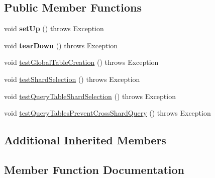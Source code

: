 \subsection*{Public Member Functions}
\begin{DoxyCompactItemize}
\item 
\mbox{\label{classtestsuite_1_1fabric_1_1jdbc_1_1_test_fabric_my_s_q_l_connection_sharding_a5cb07ddf21a24b6c25ab4bf00b99fdb3}} 
void {\bfseries set\+Up} ()  throws Exception 
\item 
\mbox{\label{classtestsuite_1_1fabric_1_1jdbc_1_1_test_fabric_my_s_q_l_connection_sharding_af85548f30554a263bc67ce92c07c2f98}} 
void {\bfseries tear\+Down} ()  throws Exception 
\item 
void \mbox{\hyperlink{classtestsuite_1_1fabric_1_1jdbc_1_1_test_fabric_my_s_q_l_connection_sharding_aad69b31b22180ecde905f79c6819070a}{test\+Global\+Table\+Creation}} ()  throws Exception 
\item 
void \mbox{\hyperlink{classtestsuite_1_1fabric_1_1jdbc_1_1_test_fabric_my_s_q_l_connection_sharding_a98edb15acffc84d83916971697b7a3b2}{test\+Shard\+Selection}} ()  throws Exception 
\item 
void \mbox{\hyperlink{classtestsuite_1_1fabric_1_1jdbc_1_1_test_fabric_my_s_q_l_connection_sharding_a8cdda6c1764cfbd5d3fe85d9c671c346}{test\+Query\+Table\+Shard\+Selection}} ()  throws Exception 
\item 
void \mbox{\hyperlink{classtestsuite_1_1fabric_1_1jdbc_1_1_test_fabric_my_s_q_l_connection_sharding_a09c7d30e604228bae2af2343858df25a}{test\+Query\+Tables\+Prevent\+Cross\+Shard\+Query}} ()  throws Exception 
\end{DoxyCompactItemize}
\subsection*{Additional Inherited Members}


\subsection{Member Function Documentation}
\mbox{\label{classtestsuite_1_1fabric_1_1jdbc_1_1_test_fabric_my_s_q_l_connection_sharding_aad69b31b22180ecde905f79c6819070a}} 
